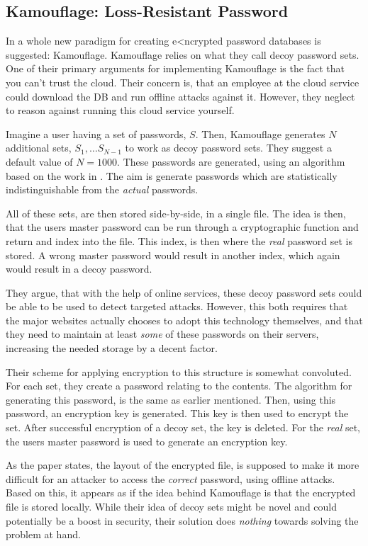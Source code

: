 		\subsection*{Kamouflage: Loss-Resistant Password}
			In \cite{kamouflage} a whole new paradigm for creating e<ncrypted password databases is suggested: Kamouflage. Kamouflage relies on what they call decoy password sets. One of their primary arguments for implementing Kamouflage is the fact that you can't trust the cloud. Their concern is, that an employee at the cloud service could download the DB and run offline attacks against it. However, they neglect to reason against running this cloud service yourself.

			Imagine a user having a set of passwords, $S$. Then, Kamouflage generates $N$ additional sets, $S_1, \dots S_{N-1}$ to work as decoy password sets. They suggest a default value of $N=1000$. These passwords are generated, using an algorithm based on the work in \cite{cracking}. The aim is generate passwords which are statistically indistinguishable from the \emph{actual} passwords. 

			All of these sets, are then stored side-by-side, in a single file. The idea is then, that the users master password can be run through a cryptographic function and return and index into the file. This index, is then where the \emph{real} password set is stored. A wrong master password would result in another index, which again would result in a decoy password.

			They argue, that with the help of online services, these decoy password sets could be able to be used to detect targeted attacks. However, this both requires that the major websites actually chooses to adopt this technology themselves, and that they need to maintain at least \emph{some} of these passwords on their servers, increasing the needed storage by a decent factor.

			Their scheme for applying encryption to this structure is somewhat convoluted. For each set, they create a password relating to the contents. The algorithm for generating this password, is the same as earlier mentioned. Then, using this password, an encryption key is generated. This key is then used to encrypt the set. After successful encryption of a decoy set, the key is deleted. For the \emph{real} set, the users master password is used to generate an encryption key.

			As the paper states, the layout of the encrypted file, is supposed to make it more difficult for an attacker to access the \emph{correct} password, using offline attacks. Based on this, it appears as if the idea behind Kamouflage is that the encrypted file is stored locally. While their idea of decoy sets might be novel and could potentially be a boost in security, their solution does \emph{nothing} towards solving the problem at hand.

